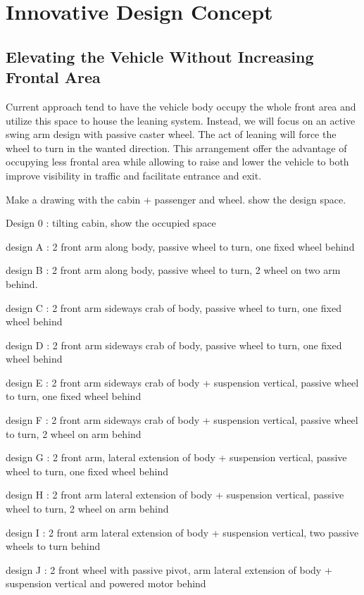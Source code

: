 \section{Innovative Design Concept}

\subsection{Elevating the Vehicle Without Increasing Frontal Area}

Current approach tend to have the vehicle body occupy the whole front area and utilize this space to house the leaning system. Instead, we will focus on an active swing arm design with passive caster wheel. The act of leaning will force the wheel to turn in the wanted direction. This arrangement offer the advantage of occupying less frontal area while allowing to raise and lower the vehicle to both improve visibility in traffic and facilitate entrance and exit.

Make a drawing with the cabin + passenger and wheel. show the design space.

Design 0 : tilting cabin, show the occupied space

design A : 2 front arm along body, passive wheel to turn, one fixed wheel behind

design B : 2 front arm along body, passive wheel to turn, 2 wheel on two arm behind.

design C : 2 front arm sideways crab of body, passive wheel to turn, one fixed wheel behind

design D : 2 front arm sideways crab of body, passive wheel to turn, one fixed wheel behind

design E : 2 front arm sideways crab of body + suspension vertical, passive wheel to turn, one fixed wheel behind

design F : 2 front arm sideways crab of body + suspension vertical, passive wheel to turn, 2 wheel on arm behind

design G : 2 front arm, lateral extension of body + suspension vertical, passive wheel to turn, one fixed wheel behind

design H : 2 front arm lateral extension of body + suspension vertical, passive wheel to turn, 2 wheel on arm behind

design I : 2 front arm lateral extension of body + suspension vertical, two passive wheels to turn behind

design J : 2 front wheel with passive pivot, arm lateral extension of body + suspension vertical and powered motor behind

